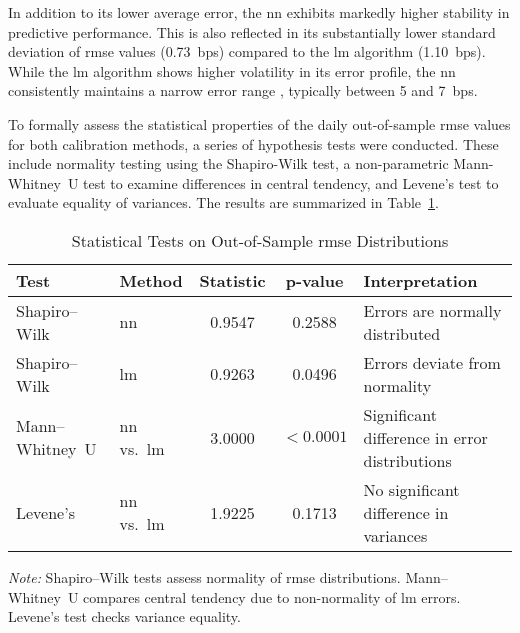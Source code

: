 In addition to its lower average error, the \ac{nn} exhibits markedly higher stability in predictive performance. This is also reflected in its substantially lower standard deviation of \ac{rmse} values (0.73~\ac{bps}) compared to the \ac{lm} algorithm (1.10~\ac{bps}). While the \ac{lm} algorithm shows higher volatility in its error profile, the \ac{nn} consistently maintains a narrow error range , typically between 5 and 7~\ac{bps}.

To formally assess the statistical properties of the daily out-of-sample \ac{rmse} values for both calibration methods, a series of hypothesis tests were conducted. These include normality testing using the Shapiro-Wilk test, a non-parametric Mann-Whitney~U test to examine differences in central tendency, and Levene's test to evaluate equality of variances. The results are summarized in Table~\ref{tab:stat_tests}.

\begin{table}[htbp]
	\centering
	\begin{threeparttable}
		\caption{Statistical Tests on Out-of-Sample \ac{rmse} Distributions}
		\label{tab:stat_tests}
		\begin{tabular}{lp{2.5cm}ccp{3.5cm}}
			\toprule
			\textbf{Test}   & \textbf{Method}      & \textbf{Statistic} & \textbf{p-value} & \textbf{Interpretation}                       \\
			\midrule
			Shapiro--Wilk   & \ac{nn}              & 0.9547             & 0.2588           & Errors are normally distributed               \\
			Shapiro--Wilk   & \ac{lm}              & 0.9263             & 0.0496           & Errors deviate from normality                 \\
			Mann--Whitney~U & \ac{nn} vs.\ \ac{lm} & 3.0000             & $<0.0001$        & Significant difference in error distributions \\
			Levene's        & \ac{nn} vs.\ \ac{lm} & 1.9225             & 0.1713           & No significant difference in variances        \\
			\bottomrule
		\end{tabular}
		\begin{tablenotes}
			\footnotesize
			\item \textit{Note:} Shapiro--Wilk tests assess normality of \ac{rmse} distributions. Mann--Whitney~U compares central tendency due to non-normality of \ac{lm} errors. Levene's test checks variance equality.
		\end{tablenotes}
	\end{threeparttable}
\end{table}

